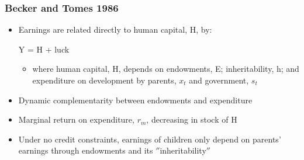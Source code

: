 \documentclass{beamer}
\begin{document}

\begin{frame}
\frametitle{Becker and Tomes 1986}

\begin{itemize}
\item Earnings are related directly to human capital, H, by: \\
\begin{center}
Y = H + luck \\
\end{center}

\begin{itemize}
\item where human capital, H, depends on endowments, E; inheritability, h;  and expenditure on development by parents, $x_{t}$ and government, $s_{t}$ 
\end{itemize}

\item Dynamic complementarity between endowments and expenditure
\item Marginal return on expenditure, $r_{m}$, decreasing in stock of H

\item Under no credit constraints, earnings of children only depend on parents' earnings through endowments and its $''$inheritability$''$

\end{itemize}
\end{frame}

\end{document}
